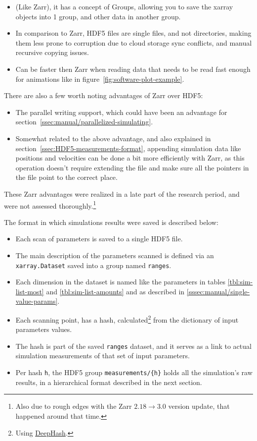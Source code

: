 \begin{itemize}
	\item (Like Zarr), it has a concept of Groups, allowing you to save the xarray objects into 1 group, and other data in another group.
	\item In comparison to Zarr, HDF5 files are single files, and not directories, making them less prone to corruption due to cloud storage sync conflicts, and manual recursive copying issues.
	\item Can be faster then Zarr when reading data that needs to be read fast enough for animations like in figure~\ref{fig:software-plot-example}.
\end{itemize}

There are also a few worth noting advantages of Zarr over HDF5:

\begin{itemize}
	\item The parallel writing support, which could have been an advantage for section~\ref{ssec:manual/parallelized-simulating}.
	\item Somewhat related to the above advantage, and also explained in section~\ref{ssec:HDF5-measurements-format}, appending simulation data like positions and velocities can be done a bit more efficiently with Zarr, as this operation doesn't require extending the file and make sure all the pointers in the file point to the correct place.
\end{itemize}

These Zarr advantages were realized in a late part of the research period, and were not assessed thoroughly.\footnote{Also due to rough edges with the Zarr $2.18 \rightarrow 3.0$ version update, that happened around that time.}

The format in which simulations results were saved is described below:

\begin{itemize}
	\item Each scan of parameters is saved to a single HDF5 file.
	\item The main description of the parameters scanned is defined via an \texttt{xarray.Dataset} saved into a group named \texttt{ranges}.
	\item Each dimension in the dataset is named like the parameters in tables \ref{tbl:sim-list-most} and \ref{tbl:sim-list-amounts} and as described in \ref{sssec:manual/single-value-params}.
	\item Each scanning point, has a hash, calculated\footnote{Using \href{https://zepworks.com/deepdiff/current/deephash.html}{DeepHash}.} from the dictionary of input parameters values.
	\item The hash is part of the saved \texttt{ranges} dataset, and it serves as a link to actual simulation measurements of that set of input parameters.
	\item Per hash \texttt{h}, the HDF5 group \texttt{measurements/\{h\}} holds all the simulation's raw results, in a hierarchical format described in the next section.
\end{itemize}

